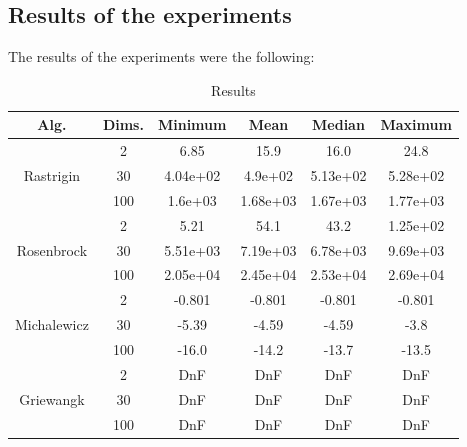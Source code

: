 \documentclass[conference]{IEEEtran}
\begin{document}
\subsection{Results of the experiments}
The results of the experiments were the following:

\begin{table}[!htbp]
    \caption{Results}
    \centering
    \begin{tabular}{|c c|c c c c|}
        \hline
        Alg. & Dims. & Minimum & Mean & Median & Maximum \\
        \hline
        \multirow{3}{*}{Rastrigin} & 2 & 6.85 & 15.9 & 16.0 & 24.8 \\
        & 30 & 4.04e+02 & 4.9e+02 & 5.13e+02 & 5.28e+02 \\
        & 100 & 1.6e+03 & 1.68e+03 & 1.67e+03 & 1.77e+03 \\
        \hline
        \multirow{3}{*}{Rosenbrock} & 2 & 5.21 & 54.1 & 43.2 & 1.25e+02 \\
        & 30 & 5.51e+03 & 7.19e+03 & 6.78e+03 & 9.69e+03 \\
        & 100 & 2.05e+04 & 2.45e+04 & 2.53e+04 & 2.69e+04 \\
        \hline
        \multirow{3}{*}{Michalewicz} & 2 & -0.801 & -0.801 & -0.801 & -0.801 \\
        & 30 & -5.39 & -4.59 & -4.59 & -3.8 \\
        & 100 & -16.0 & -14.2 & -13.7 & -13.5 \\
        \hline
        \multirow{3}{*}{Griewangk} & 2 & DnF & DnF & DnF & DnF \\
        & 30 & DnF & DnF & DnF & DnF \\
        & 100 & DnF & DnF & DnF & DnF \\
        \hline
    \end{tabular}
\end{table}
\end{document}
